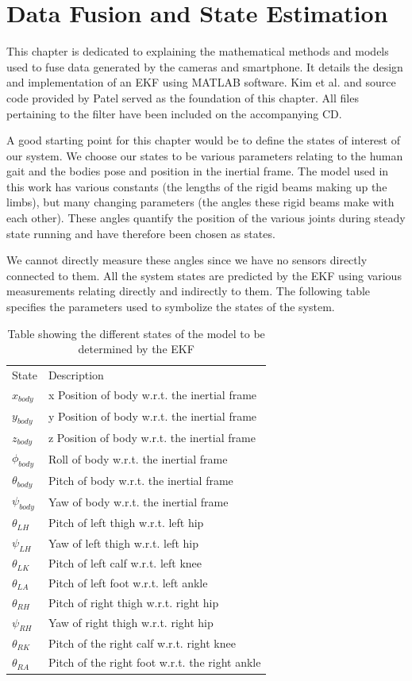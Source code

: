 \chapter{Data Fusion and State Estimation}
This chapter is dedicated to explaining the mathematical methods and models used to fuse data generated by the cameras and smartphone. It details the design and implementation of an EKF using MATLAB software. Kim et al. \cite{kim2011kalman} and source code provided by Patel served as the foundation of this chapter. All files pertaining to the filter have been included on the accompanying CD.

A good starting point for this chapter would be to define the states of interest of our system. We choose our states to be various parameters relating to the human gait and the bodies pose and position in the inertial frame. The model used in this work has various constants (the lengths of the rigid beams making up the limbs), but many changing parameters (the angles these rigid beams make with each other). These angles quantify the position of the various joints during steady state running and have therefore been chosen as states.

We cannot directly measure these angles since we have no sensors directly connected to them. All the system states are predicted by the EKF using various measurements relating directly and indirectly to them. The following table specifies the parameters used to symbolize the states of the system.
   
\begin{table}[!ht]
\centering
\label{statesForEkf}
\begin{tabular}{ll}
State & Description \\
$x_{body}$  	&x Position of body w.r.t. the inertial frame\\
$y_{body}$     &y Position of body w.r.t. the inertial frame\\
$z_{body}$     &z Position of body w.r.t. the inertial frame\\
$\phi_{body}$      &Roll of body w.r.t. the inertial frame\\
$\theta_{body}$    &Pitch of body w.r.t. the inertial frame\\
$\psi_{body}$      &Yaw of body w.r.t. the inertial frame\\
$\theta_{LH}$     &Pitch of left thigh w.r.t. left hip\\
$\psi_{LH}$      &Yaw of left thigh w.r.t. left hip\\
$\theta_{LK}$    &Pitch of left calf w.r.t. left knee\\
$\theta_{LA}$   &Pitch of left foot w.r.t. left ankle\\
$\theta_{RH}$    &Pitch of right thigh w.r.t. right hip\\
$\psi_{RH}$      &Yaw of right thigh w.r.t. right hip\\
$\theta_{RK}$   &Pitch of the right calf w.r.t. right knee\\
$\theta_{RA}$  &Pitch of the right foot w.r.t. the right ankle\\
\end{tabular}
\caption{Table showing the different states of the model to be determined by the EKF}
\end{table}

